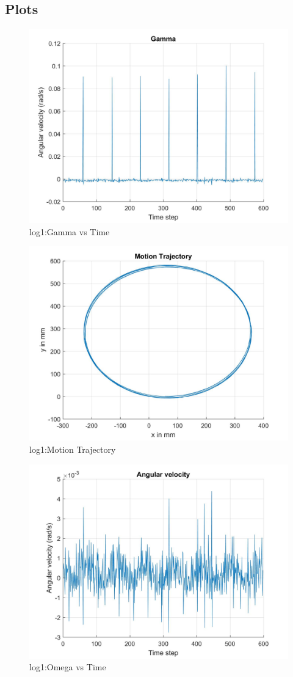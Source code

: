 \documentclass[paper=a4, fontsize=11pt]{scrartcl} %
\numberwithin{equation}{section} %
\numberwithin{figure}{section} %
\numberwithin{table}{section} %
\begin{document}
\begin{appendix}
\section{Plots}
\label{sec:plots}

\begin{figure}[H]
	\centering
	\includegraphics[width = 0.6\linewidth]{./figures/log1/gammaVsTime.jpg}
	\caption{log1:Gamma vs Time}
\end{figure}

\begin{figure}[H]
	\centering
	\includegraphics[width = 0.6\linewidth]{./figures/log1/motionTrajectory.jpg}
	\caption{log1:Motion Trajectory}
\end{figure}

\begin{figure}[H]
	\centering
	\includegraphics[width = 0.6\linewidth]{./figures/log1/omegaVsTime.jpg}
	\caption{log1:Omega vs Time}
\end{figure}


\end{appendix}
\end{document}
